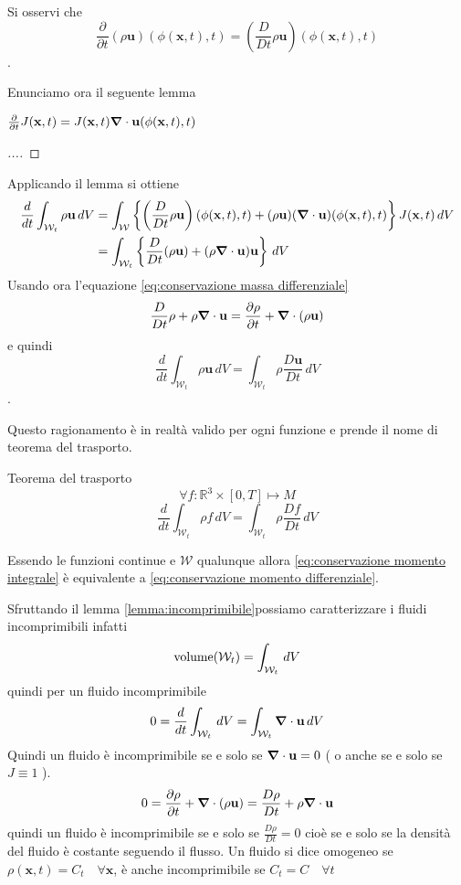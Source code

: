 Si osservi che $$\frac{\partial}{\partial t} (\rho \mathbf{u})(\phi(\mathbf{x},t),t) = \left(\frac{D}{D t} \rho \mathbf{u}\right)(\phi(\mathbf{x},t),t) $$.

Enunciamo ora il seguente lemma
\begin{lemma}\label{lemma:incomprimibile}
$\frac{\partial}{\partial t}  J(\mathbf{x},t) = J(\mathbf{x},t) \boldsymbol{\nabla} \cdot \mathbf{u} (\phi(\mathbf{x},t),t)$  
\end{lemma}
\begin{proof}
[...]
\end{proof}

Applicando il lemma si ottiene
\begin{equation*}
\begin{split}
\frac{d}{dt}\int_{\mathcal{W}_t}\rho\mathbf{u}\, dV &= \int_{\mathcal{W}} \left \{ \left ( \frac{D}{Dt}\rho\mathbf{u} \right )(\phi(\mathbf{x},t),t)+(\rho\mathbf{u})(\boldsymbol{\nabla}\cdot\mathbf{u})(\phi(\mathbf{x},t),t) \right \} J(\mathbf{x},t)\, dV\\
&=\int_{\mathcal{W}_t}\left \{ \frac{D}{Dt}(\rho\mathbf{u})+(\rho\boldsymbol{\nabla}\cdot\mathbf{u})\mathbf{u}\right \}\,dV
\end{split}
\end{equation*}
Usando ora l'equazione \ref{eq:conservazione massa differenziale}
$$\frac{D}{Dt}\rho+\rho\boldsymbol{\nabla}\cdot\mathbf{u}=\frac{\partial\rho}{\partial t}+\boldsymbol{\nabla}\cdot(\rho\mathbf{u})$$
e quindi
$$\frac{d}{dt}\int_{\mathcal{W}_t}\rho\mathbf{u}\, dV = \int_{\mathcal{W}_t}\rho\frac{D\mathbf{u}}{Dt}\, dV$$.

Questo ragionamento è in realtà valido per ogni funzione e prende il nome di teorema del trasporto.
\begin{theorem}{Teorema del trasporto}
$$ \forall f:\mathbb{R}^3\times[0,T]\mapsto M $$ $$\frac{d}{dt}\int_{\mathcal{W}_t}\rho f\, dV = \int_{\mathcal{W}_t}\rho\frac{Df}{Dt}\,dV$$
\end{theorem}

Essendo le funzioni continue e $\mathcal{W}$ qualunque allora \ref{eq:conservazione momento integrale} è equivalente a \ref{eq:conservazione momento differenziale}.

Sfruttando il lemma \ref{lemma:incomprimibile}possiamo caratterizzare i fluidi incomprimibili infatti
$$\operatorname{volume}(\mathcal{W}_t) = \int_{\mathcal{W}_t} \, dV$$
quindi per un fluido incomprimibile
$$0 = \frac{d}{dt} \int_{\mathcal{W}_t} \, dV  = \int_{\mathcal{W}_t} \boldsymbol{\nabla} \cdot \mathbf{u} \, dV$$
Quindi un fluido è incomprimibile se e solo se $\boldsymbol{\nabla} \cdot \mathbf{u}=0$ ( o anche se e solo se $J \equiv 1$ ).
$$0 = \frac{\partial \rho}{\partial t} + \boldsymbol{\nabla}\cdot(\rho \mathbf{u}) = \frac{D\rho}{Dt} + \rho\boldsymbol{\nabla}\cdot \mathbf{u}$$
quindi un fluido è incomprimibile se e solo se $\frac{D \rho}{Dt} = 0$ cioè se e solo se la densità del fluido è costante seguendo il flusso.
Un fluido si dice omogeneo se $\rho(\mathbf{x},t)=C_t \quad \forall \mathbf{x}$, è anche incomprimibile se $C_t=C \quad \forall t$

